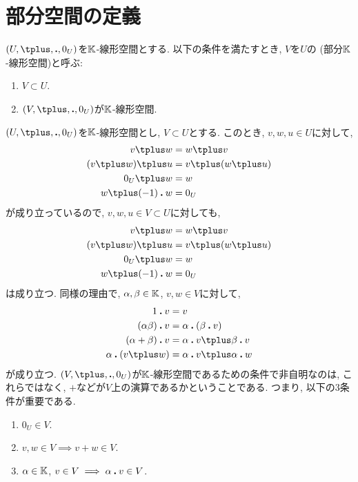 \section{部分空間の定義}
\label{sec:subspace:def}
\begin{definition}
  $(U,\plus,\act,0_U)$を$\mathbb{K}$-線形空間とする.
  以下の条件を満たすとき,
  $V$を$U$の (部分$\mathbb{K}$-線形空間)と呼ぶ:
  \begin{enumerate}
  \item $V\subset U$.
  \item $(V,\plus,\act,0_U)$が$\mathbb{K}$-線形空間.
  \end{enumerate}
\end{definition}
\begin{remark}
  $(U,\plus,\act,0_U)$を$\mathbb{K}$-線形空間とし, $V\subset U$とする.
このとき, $v,w,u\in U$に対して,
\begin{align*}
  v\plus w&=w\plus v\\
  (v\plus w)\plus u&=v\plus (w\plus u)\\
  0_U\plus w&=w\\
  w\plus (-1)\act w&=0_U
\end{align*}
が成り立っているので,
$v,w,u\in V\subset U$に対しても,
\begin{align*}
  v\plus w&=w\plus v\\
  (v\plus w)\plus u&=v\plus (w\plus u)\\
  0_U\plus w&=w\\
  w\plus (-1)\act w&=0_U
\end{align*}
は成り立つ.
同様の理由で,
$\alpha,\beta\in \mathbb{K}$, $v,w\in V$に対して,
\begin{align*}
  1\act v&=v\\
  (\alpha\beta)\act v&=\alpha\act(\beta\act v)\\
  (\alpha+\beta)\act v&=\alpha\act v\plus \beta\act v\\
  \alpha\act(v\plus w)&=\alpha\act v\plus \alpha\act w
\end{align*}
が成り立つ.
$(V,\plus ,\act,0_U)$が$\mathbb{K}$-線形空間であるための条件で非自明なのは,
これらではなく, $\plus $などが$V$上の演算であるかということである.
つまり, 以下の$3$条件が重要である.
\begin{enumerate}
  \item $0_U\in V$.
  \item $v,w\in V \implies v\plus w\in V$.
  \item $\alpha\in\mathbb{K}$, $v\in V \implies \alpha\mathbin{\boldsymbol{.}} v\in V$.
\end{enumerate}
\end{remark}
